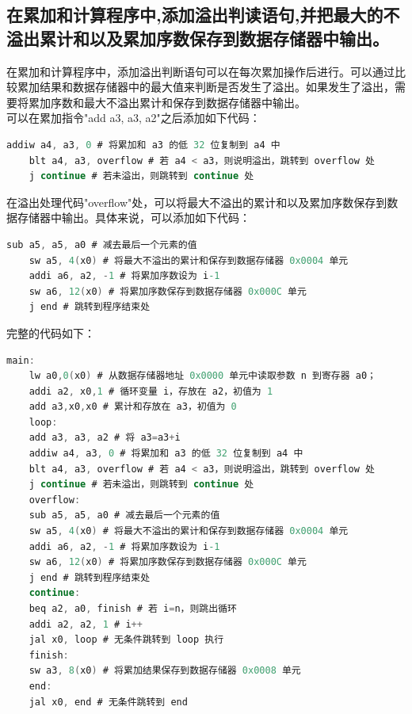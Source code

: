 \documentclass{article}
\begin{document}
    \subsection{在累加和计算程序中,添加溢出判读语句,并把最大的不溢出累计和以及累加序数保存到数据存储器中输出。}
    在累加和计算程序中，添加溢出判断语句可以在每次累加操作后进行。可以通过比较累加结果和数据存储器中的最大值来判断是否发生了溢出。如果发生了溢出，需要将累加序数和最大不溢出累计和保存到数据存储器中输出。\\
    可以在累加指令"add a3, a3, a2"之后添加如下代码：
    \begin{lstlisting}[language=C]
    addiw a4, a3, 0 # 将累加和 a3 的低 32 位复制到 a4 中
    blt a4, a3, overflow # 若 a4 < a3，则说明溢出，跳转到 overflow 处
    j continue # 若未溢出，则跳转到 continue 处
    \end{lstlisting}
    在溢出处理代码"overflow"处，可以将最大不溢出的累计和以及累加序数保存到数据存储器中输出。具体来说，可以添加如下代码：
    \begin{lstlisting}[language=C]
    sub a5, a5, a0 # 减去最后一个元素的值
    sw a5, 4(x0) # 将最大不溢出的累计和保存到数据存储器 0x0004 单元
    addi a6, a2, -1 # 将累加序数设为 i-1
    sw a6, 12(x0) # 将累加序数保存到数据存储器 0x000C 单元
    j end # 跳转到程序结束处
    \end{lstlisting}
    完整的代码如下：
    \begin{lstlisting}[language=C]
    main:
    lw a0,0(x0) # 从数据存储器地址 0x0000 单元中读取参数 n 到寄存器 a0；
    addi a2, x0,1 # 循环变量 i，存放在 a2，初值为 1
    add a3,x0,x0 # 累计和存放在 a3，初值为 0
    loop:
    add a3, a3, a2 # 将 a3=a3+i
    addiw a4, a3, 0 # 将累加和 a3 的低 32 位复制到 a4 中
    blt a4, a3, overflow # 若 a4 < a3，则说明溢出，跳转到 overflow 处
    j continue # 若未溢出，则跳转到 continue 处
    overflow:
    sub a5, a5, a0 # 减去最后一个元素的值
    sw a5, 4(x0) # 将最大不溢出的累计和保存到数据存储器 0x0004 单元
    addi a6, a2, -1 # 将累加序数设为 i-1
    sw a6, 12(x0) # 将累加序数保存到数据存储器 0x000C 单元
    j end # 跳转到程序结束处
    continue:
    beq a2, a0, finish # 若 i=n，则跳出循环
    addi a2, a2, 1 # i++
    jal x0, loop # 无条件跳转到 loop 执行
    finish:
    sw a3, 8(x0) # 将累加结果保存到数据存储器 0x0008 单元
    end:
    jal x0, end # 无条件跳转到 end
    \end{lstlisting}
\end{document}
